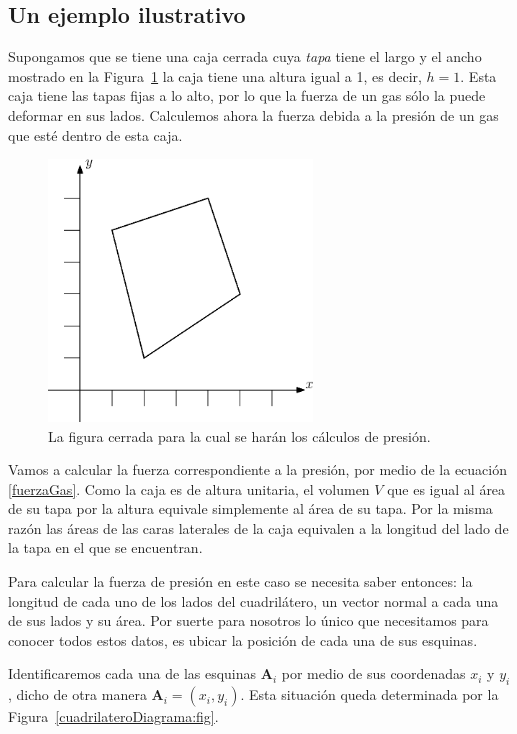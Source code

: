 \subsection{Un ejemplo ilustrativo}

Supongamos que se tiene una caja cerrada cuya \emph{tapa} tiene el largo y el ancho mostrado en la Figura~\ref{cuadrilatero:fig} la caja tiene una altura igual a 1, es decir, $h=1$. Esta caja tiene las tapas fijas a lo alto, por lo que la fuerza de un gas sólo la puede deformar en sus lados.
Calculemos ahora la fuerza debida a la presión de un gas que esté dentro de esta caja.

\begin{figure}
 \centering
 \includegraphics[width=7cm]{img/01/cuadrilatero}
 \caption[Cuadrilátero]{ 
 La figura cerrada para la cual se harán los cálculos de presión.
 } \label{cuadrilatero:fig}
\end{figure}

Vamos a calcular la fuerza correspondiente a la presión, por medio de la ecuación \eqref{fuerzaGas}.
Como la caja es de altura unitaria, el volumen $V$ que es igual al área de su tapa por la altura equivale simplemente al área de su tapa.
Por la misma razón las áreas de las caras laterales de la caja equivalen a la longitud del lado de la tapa en el que se encuentran.

Para calcular la fuerza de presión en este caso se necesita saber entonces: la longitud de cada uno de los lados del cuadrilátero, un vector normal a cada una de sus lados y su área.
Por suerte para nosotros lo único que necesitamos para conocer todos estos datos, es ubicar la posición de cada una de sus esquinas.

Identificaremos cada una de las esquinas $\textbf{A}_i$ por medio de sus coordenadas $x_i$ y $y_i$, dicho de otra manera $\textbf{A}_i = ( x_i , y_i)$.
Esta situación queda determinada por la Figura~\ref{cuadrilateroDiagrama:fig}.

